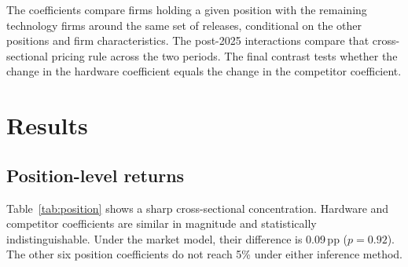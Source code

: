 \documentclass[review,12pt,authoryear]{elsarticle}
\newcommand{\pp}{\,pp}
\begin{document}
The coefficients compare firms holding a given position with the remaining
technology firms around the same set of releases, conditional on the other
positions and firm characteristics. The post-2025 interactions compare that
cross-sectional pricing rule across the two periods. The final contrast
tests whether the change in the hardware coefficient equals the change in
the competitor coefficient.

\section{Results}\label{sec:results}

\subsection{Position-level returns}

Table~\ref{tab:position} shows a sharp cross-sectional concentration.
Hardware and competitor coefficients are similar in magnitude and
statistically indistinguishable. Under the market model, their difference is
0.09\pp{} ($p=0.92$). The other six position coefficients do not reach 5\%
under either inference method.
\end{document}
